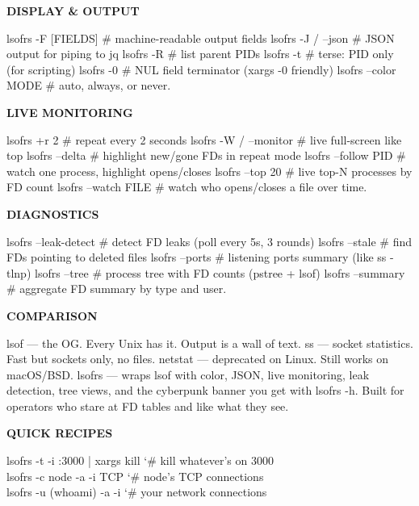 \documentclass[11pt,a4paper,twoside]{book}
\begin{document}
\vspace{12pt}
{\bfseries\color{neonyellow} \textbf{DISPLAY} \& OUTPUT}\vspace{4pt}

lsofrs -F [FIELDS]  \# machine-readable output fields lsofrs -J / --json  \# JSON output for piping to jq lsofrs -R           \# list parent PIDs lsofrs -t           \# terse: PID only (for scripting) lsofrs -0           \# NUL field terminator (xargs -0 friendly) lsofrs --color MODE \# auto, always, or never.


\vspace{12pt}
{\bfseries\color{neonyellow} LIVE MONITORING}\vspace{4pt}

lsofrs +r 2         \# repeat every 2 seconds lsofrs -W / --monitor \# live full-screen like top lsofrs --delta       \# highlight new/gone FDs in repeat mode lsofrs --follow PID  \# watch one process, highlight opens/closes lsofrs --top 20     \# live top-N processes by FD count lsofrs --watch FILE  \# watch who opens/closes a file over time.


\vspace{12pt}
{\bfseries\color{neonyellow} DIAGNOSTICS}\vspace{4pt}

lsofrs --leak-detect \# detect FD leaks (poll every 5s, 3 rounds) lsofrs --stale       \# find FDs pointing to deleted files lsofrs --ports       \# listening ports summary (like ss -tlnp) lsofrs --tree        \# process tree with FD counts (pstree + lsof) lsofrs --summary     \# aggregate FD summary by type and user.


\vspace{12pt}
{\bfseries\color{neonyellow} COMPARISON}\vspace{4pt}

lsof    — the OG. Every Unix has it. Output is a wall of text. ss      — socket statistics. Fast but sockets only, no files. netstat — deprecated on Linux. Still works on macOS/BSD. lsofrs  — wraps lsof with color, JSON, live monitoring, leak detection, tree views, and the cyberpunk banner you get with lsofrs -h. Built for operators who stare at FD tables and like what they see.


\vspace{12pt}
{\bfseries\color{neonyellow} QUICK RECIPES}\vspace{4pt}

\begin{codebox}
\color{neongreen}lsofrs -t -i :3000 | xargs kill  {\char`\#} kill whatever's on 3000\\
\color{neongreen}lsofrs -c node -a -i TCP          {\char`\#} node's TCP connections\\
\color{neongreen}lsofrs -u (whoami) -a -i         {\char`\#} your network connections\\
\end{codebox}
\end{document}

